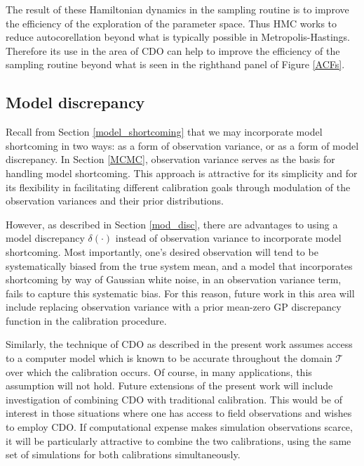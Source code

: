 \documentclass{article}
\begin{document}
The result of these Hamiltonian dynamics in the sampling routine is to improve the efficiency of the exploration of the parameter space. Thus HMC works to reduce autocorellation beyond what is typically possible in Metropolis-Hastings. Therefore its use in the area of CDO can help to improve the efficiency of the sampling routine beyond what is seen in the righthand panel of Figure \ref{ACFs}.



\subsection{Model discrepancy}

Recall from Section  \ref{model_shortcoming} that we may incorporate model shortcoming in two ways: as a form of observation variance, or as a form of model discrepancy. In Section \ref{MCMC}, observation variance serves as the basis for handling model shortcoming. This approach is attractive for its simplicity and for its flexibility in facilitating different calibration goals through modulation of the observation variances and their prior distributions. 

However, as described in Section \ref{mod_disc}, there are advantages to using a model discrepancy $\delta(\cdot)$ instead of observation variance to incorporate model shortcoming. Most importantly, one's desired observation will tend to be systematically biased from the true system mean, and a model that incorporates shortcoming by way of Gaussian white noise, in an observation variance term, fails to capture this systematic bias. For this reason, future work in this area will include replacing observation variance with a prior mean-zero GP discrepancy function in the calibration procedure.

Similarly, the technique of CDO as described in the present work assumes access to a computer model which is known to be accurate throughout the domain $\mathcal T$ over which the calibration occurs. Of course, in many applications, this assumption will not hold. Future extensions of the present work will include investigation of combining CDO with traditional calibration. This would be of interest in those situations where one has access to field observations and wishes to employ CDO. If computational expense makes simulation observations scarce, it will be particularly attractive to combine the two calibrations, using the same set of simulations for both calibrations simultaneously.
\end{document}

